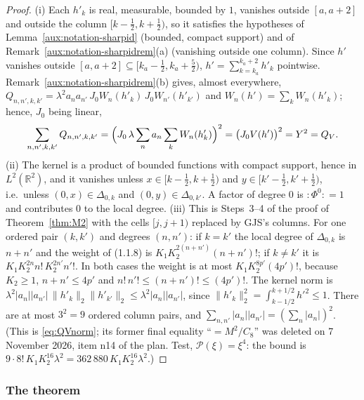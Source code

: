 \documentclass[11pt,a4paper]{article}
\theoremstyle{plain}
\theoremstyle{definition}
\theoremstyle{plain}
\theoremstyle{definition}
\newcommand{\R}{\mathbb{R}}
\begin{document}
\begin{proof}
(i) Each $h'_k$ is real, measurable, bounded by $1$, vanishes outside $[a,a+2]$ and outside the
column $[k-\frac12,k+\frac12)$, so it satisfies the hypotheses of
Lemma~\ref{aux:notation-sharpid} (bounded, compact support) and of
Remark~\ref{aux:notation-sharpidrem}(a) (vanishing outside one column).  Since $h'$ vanishes
outside $[a,a+2]\subseteq[k_a-\frac12,k_a+\frac52)$, $h'=\sum_{k=k_a}^{k_a+2}h'_k$ pointwise.
Remark~\ref{aux:notation-sharpidrem}(b) gives, almost everywhere,
$Q_{n,n',k,k'}=\lambda^2a_na_{n'}\,J_0W_n(h'_k)\,J_0W_{n'}(h'_{k'})$ and $W_n(h')=\sum_kW_n(h'_k)$;
hence, $J_0$ being linear,
\[
 \sum_{n,n',k,k'}Q_{n,n',k,k'}=\Bigl(J_0\,\lambda\sum_na_n\sum_kW_n(h'_k)\Bigr)^2
 =\bigl(J_0V(h')\bigr)^2=Y^2=Q_V .
\]
(ii) The kernel is a product of bounded functions with compact support, hence in $L^2(\R^2)$, and
it vanishes unless $x\in[k-\frac12,k+\frac12)$ and $y\in[k'-\frac12,k'+\frac12)$, i.e.\ unless
$(0,x)\in\Delta_{0,k}$ and $(0,y)\in\Delta_{0,k'}$.  A factor of degree $0$ is ${:}\Phi^0{:}=1$
and contributes $0$ to the local degree.
(iii) This is Steps~3--4 of the proof of Theorem~\ref{thm:M2} with
the cells $[j,j+1)$ replaced by GJS's columns.  For one ordered pair $(k,k')$ and degrees
$(n,n')$: if $k=k'$ the local degree of $\Delta_{0,k}$ is $n+n'$ and the weight of (1.1.8) is
$K_1K_2^{2(n+n')}(n+n')!$; if $k\ne k'$ it is $K_1K_2^{2n}n!\,K_2^{2n'}n'!$.  In both cases the
weight is at most $K_1K_2^{8p'}(4p')!$, because $K_2\ge1$, $n+n'\le4p'$ and
$n!\,n'!\le(n+n')!\le(4p')!$.  The kernel norm is
$\lambda^2|a_n||a_{n'}|\,\|h'_k\|_2\|h'_{k'}\|_2\le\lambda^2|a_n||a_{n'}|$, since
$\|h'_k\|_2^2=\int_{k-1/2}^{k+1/2}h'^2\le1$.  There are at most $3^2=9$ ordered column pairs, and
$\sum_{n,n'}|a_n||a_{n'}|=(\sum_n|a_n|)^2$.  (This is \eqref{eq:QVnorm}; its former final equality ``$=M^2/C_8$'' was deleted on
7 November 2026, item n14 of the plan.  Test, $\mathscr P(\xi)=\xi^4$: the
bound is $9\cdot8!\,K_1K_2^{16}\lambda^2=362\,880\,K_1K_2^{16}\lambda^2$.)
\end{proof}

\subsubsection{The theorem}\label{sub:d4-thm}
\end{document}
